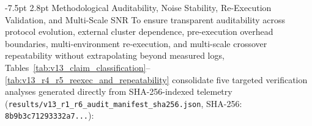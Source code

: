 \documentclass[10pt,a4paper]{article}
\makeatletter
\renewcommand\subsection{\@startsection{subsection}{2}{\z@}%
  {-7.5pt \@plus -2pt \@minus -1pt}%
  {2.8pt \@plus 1pt}%
  {\normalfont\normalsize\bfseries}}
\makeatother
\begin{document}
\subsection{Methodological Auditability, Noise Stability, Re-Execution Validation, and Multi-Scale SNR}
\label{subsec:v13_r1_r5_audit}
To ensure transparent auditability across protocol evolution, external cluster dependence, pre-execution overhead boundaries, multi-environment re-execution, and multi-scale crossover repeatability without extrapolating beyond measured logs, Tables~\ref{tab:v13_claim_classification}--\ref{tab:v13_r4_r5_reexec_and_repeatability} consolidate five targeted verification analyses generated directly from SHA-256-indexed telemetry (\texttt{results/\allowbreak{}v13\_\allowbreak{}r1\_\allowbreak{}r6\_\allowbreak{}audit\_\allowbreak{}manifest\_\allowbreak{}sha256.json}, SHA-256: \texttt{8b9b3c71293332a7...}):
\end{document}

